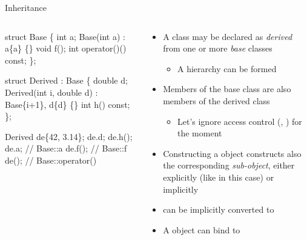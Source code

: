 \begin{frame}[fragile]{Inheritance}

  \begin{columns}[T]
    \begin{column}{.4\textwidth}
  \begin{codeblock}{
struct Base \{
  int a;
  Base(int a) : a\{a\} \{\}
  void f();
  int operator()() const;
\};

struct Derived \alert{: Base} \{
  double d;
  Derived(int i, double d)
    : \alert{Base}\{i+1\}, d\{d\} \{\}
  int h() const;
\};

Derived de\{42, 3.14\};
de.d;
de.h();
de.a;   // Base::a
de.f(); // Base::f
de();   // Base::operator()
}\end{codeblock}
   
    \end{column}
    \begin{column}{.6\textwidth}

      \begin{itemize}
      \item A class may be declared as \textit{derived} from one or more
        \textit{base} classes
        \begin{itemize}
        \item A hierarchy can be formed
        \end{itemize}
      \item Members of the base class are also members of the derived class
        \begin{itemize}
        \item Let's ignore access control (, ) for
          the moment
        \end{itemize}
      \item Constructing a  object constructs also the
        corresponding  \textit{sub-object}, either explicitly (like
        in this case) or implicitly
      \item<2->  can be implicitly converted to 
      \item<3-> A  object can bind to 
      \end{itemize}
    \end{column}
  \end{columns}

\end{frame}

